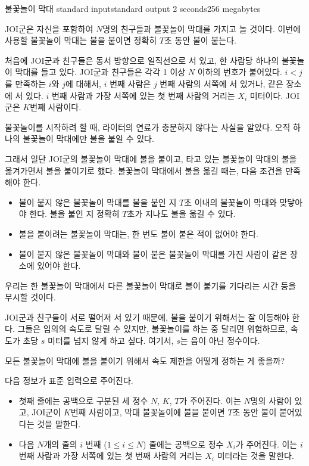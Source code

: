 \begin{problem}{불꽃놀이 막대}
	{standard input}{standard output}
	{2 seconds}{256 megabytes}{}
	
	JOI군은 자신을 포함하여 $N$명의 친구들과 불꽃놀이 막대를 가지고 놀 것이다. 이번에 사용할 불꽃놀이 막대는 불을 붙이면 정확히 $T$초 동안 불이 붙는다.
	
	처음에 JOI군과 친구들은 동서 방향으로 일직선으로 서 있고, 한 사람당 하나의 불꽃놀이 막대를 들고 있다. JOI군과 친구들은 각각 1 이상 $N$ 이하의 번호가 붙어있다. $i<j$를 만족하는 $i$와 $j$에 대해서, $i$ 번째 사람은 $j$ 번째 사람의 서쪽에 서 있거나, 같은 장소에 서 있다. $i$ 번째 사람과 가장 서쪽에 있는 첫 번째 사람의 거리는 $X_i$ 미터이다. JOI군은 $K$번째 사람이다.
	
	불꽃놀이를 시작하려 할 때, 라이터의 연료가 충분하지 않다는 사실을 알았다. 오직 하나의 불꽃놀이 막대에만 불을 붙일 수 있다.
	
	그래서 일단 JOI군의 불꽃놀이 막대에 불을 붙이고, 타고 있는 불꽃놀이 막대의 불을 옮겨가면서 불을 붙이기로 했다. 불꽃놀이 막대에서 불을 옮길 때는, 다음 조건을 만족해야 한다.
	
	\begin{itemize}
		\item 불이 붙지 않은 불꽃놀이 막대를 불을 붙인 지 $T$초 이내의 불꽃놀이 막대와 맞닿아야 한다. 불을 붙인 지 정확히 $T$초가 지나도 불을 옮길 수 있다.
		\item 불을 붙이려는 불꽃놀이 막대는, 한 번도 불이 붙은 적이 없어야 한다.
		\item 불이 붙지 않은 불꽃놀이 막대와 불이 붙은 불꽃놀이 막대를 가진 사람이 같은 장소에 있어야 한다.
	\end{itemize}
	
	우리는 한 불꽃놀이 막대에서 다른 불꽃놀이 막대로 불이 붙기를 기다리는 시간 등을 무시할 것이다.
	
	JOI군과 친구들이 서로 떨어져 서 있기 때문에, 불을 붙이기 위해서는 잘 이동해야 한다. 그들은 임의의 속도로 달릴 수 있지만, 불꽃놀이를 하는 중 달리면 위험하므로, 속도가 초당 $s$ 미터를 넘지 않게 하고 싶다. 여기서, $s$는 음이 아닌 정수이다.
	
	모든 불꽃놀이 막대에 불을 붙이기 위해서 속도 제한을 어떻게 정하는 게 좋을까?
	
	\InputFile
	
	다음 정보가 표준 입력으로 주어진다.
	
	\begin{itemize}
		\item 첫째 줄에는 공백으로 구분된 세 정수 $N$, $K$, $T$가 주어진다. 이는 $N$명의 사람이 있고, JOI군이 $K$번째 사람이고, 막대 불꽃놀이에 불을 붙이면 $T$초 동안 불이 붙어있다는 것을 말한다. 
		\item 다음 $N$개의 줄의 $i$ 번째 ($1 \le i \le N$) 줄에는 공백으로 정수 $X_i$가 주어진다. 이는 $i$ 번째 사람과 가장 서쪽에 있는 첫 번째 사람의 거리는 $X_i$ 미터라는 것을 말한다.
	\end{itemize}
	

\end{problem}

